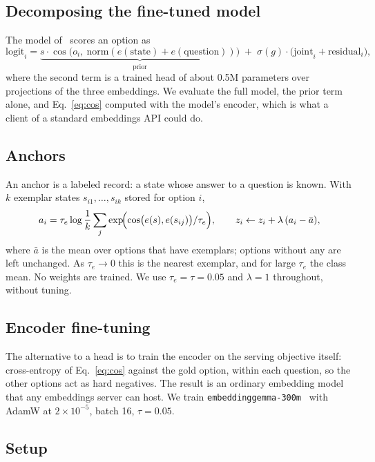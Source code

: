 \documentclass[11pt]{article}
\begin{document}
\subsection{Decomposing the fine-tuned model}

The model of~\cite{egtd} scores an option as
\[
\text{logit}_i = \underbrace{s\cdot\cos\bigl(o_i,\ \mathrm{norm}(e(\text{state})+e(\text{question}))\bigr)}_{\text{prior}}
\;+\; \sigma(g)\cdot\bigl(\text{joint}_i+\text{residual}_i\bigr),
\]
where the second term is a trained head of about 0.5M parameters over
projections of the three embeddings. We evaluate the full model, the prior
term alone, and Eq.~\eqref{eq:cos} computed with the model's encoder, which is
what a client of a standard embeddings API could do.

\subsection{Anchors}

An anchor is a labeled record: a state whose answer to a question is known.
With $k$ exemplar states $s_{i1},\dots,s_{ik}$ stored for option $i$,
\begin{equation}
a_i = \tau_e \log \frac{1}{k}\sum_{j}\exp\!\Bigl(\cos\bigl(e(s),e(s_{ij})\bigr)/\tau_e\Bigr),
\qquad z_i \leftarrow z_i + \lambda\,(a_i-\bar a),
\end{equation}
where $\bar a$ is the mean over options that have exemplars; options without
any are left unchanged. As $\tau_e\to 0$ this is the nearest exemplar, and for
large $\tau_e$ the class mean. No weights are trained. We use
$\tau_e=\tau=0.05$ and $\lambda=1$ throughout, without tuning.

\subsection{Encoder fine-tuning}

The alternative to a head is to train the encoder on the serving objective
itself: cross-entropy of Eq.~\eqref{eq:cos} against the gold option, within
each question, so the other options act as hard negatives. The result is an
ordinary embedding model that any embeddings server can host. We train
\texttt{embeddinggemma-300m}~\cite{eg} with AdamW at $2\times10^{-5}$,
batch 16, $\tau=0.05$.

\subsection{Setup}
\end{document}
